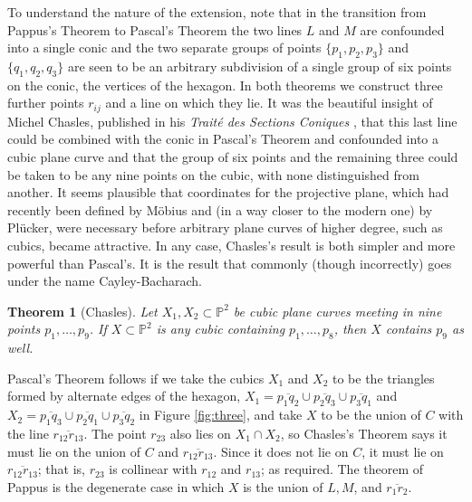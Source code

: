 \documentclass{bull-l}
\theoremstyle{pplain}
\newtheorem{thmcb}{Theorem}
\theoremstyle{definition}
\begin{document}
To understand the nature of the extension, note that in the transition from
Pappus's Theorem to Pascal's Theorem the two lines $L$ and $M$ are confounded
into a single conic and the two separate groups of points $\{p_1,p_2,p_3\}$ and
$\{q_1,q_2,q_3\}$ are seen to be an arbitrary subdivision of a single group of
six points on the conic, the vertices of the hexagon.  In both theorems we
construct three further points $r_{ij}$ and a line on which they lie.  It was
the beautiful insight of Michel Chasles, published in his \emph{Trait\'e des
Sections Coniques} \cite{Ch},  that this last line could be combined with the
conic in Pascal's Theorem and confounded into a cubic plane curve and that the
group of six points and the remaining three could be taken to be any nine
points on the cubic, with none distinguished from another.  It seems plausible
that coordinates for the projective plane, which had recently been defined by 
M\"obius and (in a way closer to the modern one) by Pl\"ucker, were necessary
before arbitrary plane curves of higher degree, such as cubics, became
attractive.  In any case, Chasles's result is both simpler and more powerful
than Pascal's.  It is the result that commonly (though incorrectly) goes under
the name Cayley-Bacharach.

\begin{thmcb}[Chasles] \label{thmcb3}
Let $X_1,X_2\subset \mathbb{P}^2$ be cubic plane curves meeting in nine points
$p_1,\dots,p_9$.  If $X\subset \mathbb{P}^2$ is any cubic containing
$p_1,\dots,p_8$, then $X$ contains $p_9$ as well.
\end{thmcb}

Pascal's Theorem follows if we take the cubics $X_1$ and $X_2$ to be the
triangles formed by alternate edges of the hexagon,  $X_1=\overline{p_1q_2}
\cup\overline{p_2q_3}\cup \overline{p_3q_1}$ and $X_2=\overline{p_1q_3}\cup 
\overline{p_2q_1}\cup \overline{p_3q_2}$ in Figure \ref{fig:three}, and take
$X$ to be the union of $C$ with the line $\overline{r_{12}r_{13}}$. The point
$r_{23}$ also lies on $X_1\cap X_2$, so Chasles's Theorem says it must lie on
the union of $C$ and $\overline{r_{12}r_{13}}$.  Since it does not lie on $C$,
it must lie on $\overline{r_{12}r_{13}}$; that is, $r_{23}$ is collinear with
$r_{12}$ and $r_{13}$; as required.  The theorem of Pappus is the degenerate
case in which $X$ is the union of $L,M$, and $\overline{r_1r_2}$.
\end{document}
